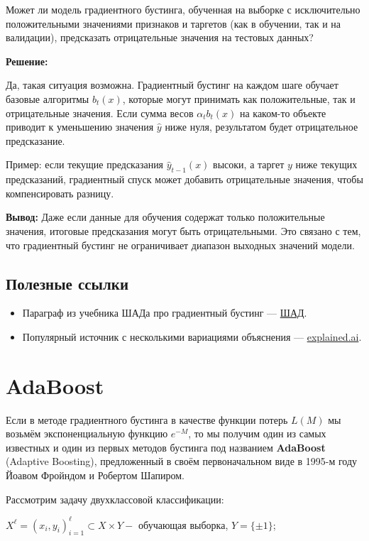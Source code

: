 Может ли модель градиентного бустинга, обученная на выборке с исключительно положительными значениями признаков и таргетов (как в обучении, так и на валидации), предсказать отрицательные значения на тестовых данных?

\textbf{Решение:}

Да, такая ситуация возможна. Градиентный бустинг на каждом шаге обучает базовые алгоритмы $b_t(x)$, которые могут принимать как положительные, так и отрицательные значения. Если сумма весов $\alpha_t b_t(x)$ на каком-то объекте приводит к уменьшению значения $\hat{y}$ ниже нуля, результатом будет отрицательное предсказание.

Пример: если текущие предсказания $\hat{y}_{t-1}(x)$ высоки, а таргет $y$ ниже текущих предсказаний, градиентный спуск может добавить отрицательные значения, чтобы компенсировать разницу.

\textbf{Вывод:} Даже если данные для обучения содержат только положительные значения, итоговые предсказания могут быть отрицательными. Это связано с тем, что градиентный бустинг не ограничивает диапазон выходных значений модели.

\subsection{Полезные ссылки}
\begin{itemize}
    \item Параграф из учебника ШАДа про градиентный бустинг — \href{https://education.yandex.ru/handbook/ml/article/gradientnyj-busting}{ШАД}.
    \item Популярный источник с несколькими вариациями объяснения — \href{https://explained.ai/gradient-boosting/}{explained.ai}.
\end{itemize}
    \section{AdaBoost}
    
    Если в методе градиентного бустинга в качестве функции потерь $L(M)$ мы возьмём экспоненциальную функцию $e^{-M}$, то мы получим один из самых известных и один из первых методов бустинга под названием \textbf{AdaBoost} (Adaptive Boosting), предложенный в своём первоначальном виде в 1995-м году Йоавом Фройндом и Робертом Шапиром.
    
    Рассмотрим задачу двухклассовой классификации:
    
    \noindent $X^{\ell}=\left(x_i, y_i\right)_{i=1}^{\ell} \subset X \times Y-$ обучающая выборка, $Y=\{ \pm 1\}$;
    

